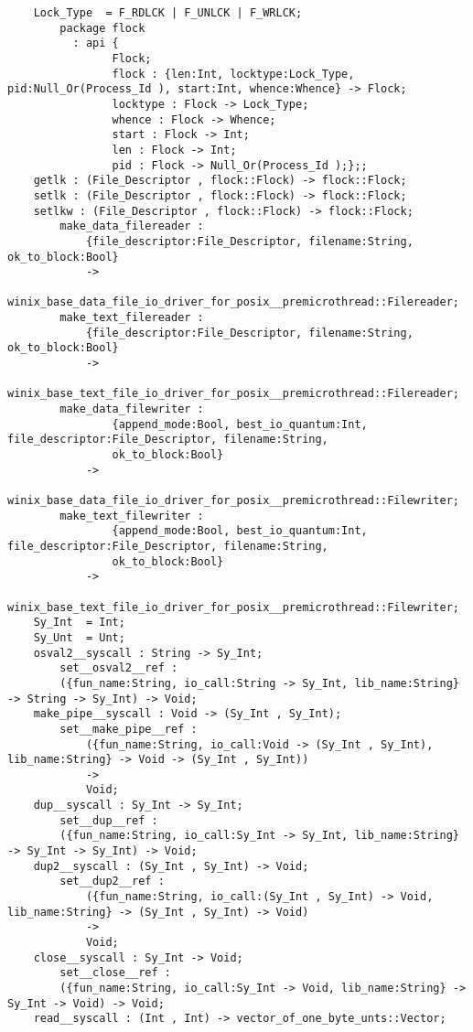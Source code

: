 \begin{verbatim}
    Lock_Type  = F_RDLCK | F_UNLCK | F_WRLCK;
        package flock
          : api {
                Flock;
                flock : {len:Int, locktype:Lock_Type, pid:Null_Or(Process_Id ), start:Int, whence:Whence} -> Flock;
                locktype : Flock -> Lock_Type;
                whence : Flock -> Whence;
                start : Flock -> Int;
                len : Flock -> Int;
                pid : Flock -> Null_Or(Process_Id );};;
    getlk : (File_Descriptor , flock::Flock) -> flock::Flock;
    setlk : (File_Descriptor , flock::Flock) -> flock::Flock;
    setlkw : (File_Descriptor , flock::Flock) -> flock::Flock;
        make_data_filereader :
            {file_descriptor:File_Descriptor, filename:String, ok_to_block:Bool}
            ->
            winix_base_data_file_io_driver_for_posix__premicrothread::Filereader;
        make_text_filereader :
            {file_descriptor:File_Descriptor, filename:String, ok_to_block:Bool}
            ->
            winix_base_text_file_io_driver_for_posix__premicrothread::Filereader;
        make_data_filewriter :
                {append_mode:Bool, best_io_quantum:Int, file_descriptor:File_Descriptor, filename:String,
                ok_to_block:Bool}
            ->
            winix_base_data_file_io_driver_for_posix__premicrothread::Filewriter;
        make_text_filewriter :
                {append_mode:Bool, best_io_quantum:Int, file_descriptor:File_Descriptor, filename:String,
                ok_to_block:Bool}
            ->
            winix_base_text_file_io_driver_for_posix__premicrothread::Filewriter;
    Sy_Int  = Int;
    Sy_Unt  = Unt;
    osval2__syscall : String -> Sy_Int;
        set__osval2__ref :
        ({fun_name:String, io_call:String -> Sy_Int, lib_name:String} -> String -> Sy_Int) -> Void;
    make_pipe__syscall : Void -> (Sy_Int , Sy_Int);
        set__make_pipe__ref :
            ({fun_name:String, io_call:Void -> (Sy_Int , Sy_Int), lib_name:String} -> Void -> (Sy_Int , Sy_Int))
            ->
            Void;
    dup__syscall : Sy_Int -> Sy_Int;
        set__dup__ref :
        ({fun_name:String, io_call:Sy_Int -> Sy_Int, lib_name:String} -> Sy_Int -> Sy_Int) -> Void;
    dup2__syscall : (Sy_Int , Sy_Int) -> Void;
        set__dup2__ref :
            ({fun_name:String, io_call:(Sy_Int , Sy_Int) -> Void, lib_name:String} -> (Sy_Int , Sy_Int) -> Void)
            ->
            Void;
    close__syscall : Sy_Int -> Void;
        set__close__ref :
        ({fun_name:String, io_call:Sy_Int -> Void, lib_name:String} -> Sy_Int -> Void) -> Void;
    read__syscall : (Int , Int) -> vector_of_one_byte_unts::Vector;

\end{verbatim}
